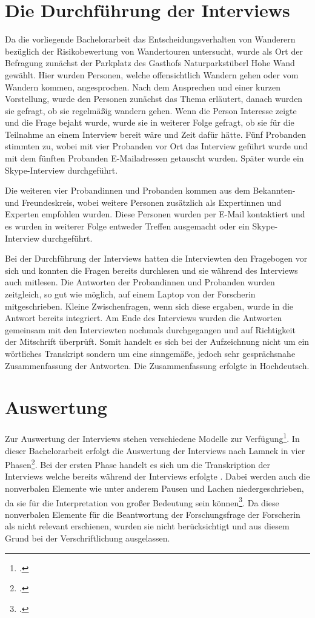 \section{Die Durchführung der Interviews}

Da die vorliegende Bachelorarbeit das Entscheidungsverhalten von Wanderern bezüglich der Risikobewertung von Wandertouren untersucht, wurde als Ort der Befragung zunächst der Parkplatz des Gasthofs Naturparkstüberl Hohe Wand gewählt. Hier wurden Personen, welche offensichtlich Wandern gehen oder vom Wandern kommen, angesprochen.
Nach dem Ansprechen und einer kurzen Vorstellung, wurde den Personen zunächst das Thema erläutert, danach wurden sie gefragt, ob sie regelmäßig wandern gehen. Wenn die Person Interesse zeigte und die Frage bejaht wurde, wurde sie in weiterer Folge gefragt, ob sie für die Teilnahme an einem Interview bereit wäre und Zeit dafür hätte. Fünf Probanden stimmten zu, wobei mit vier Probanden vor Ort das Interview geführt wurde und mit dem fünften Probanden  E-Mailadressen getauscht wurden. Später wurde ein Skype-Interview durchgeführt.

Die weiteren vier Probandinnen und Probanden kommen aus dem Bekannten- und Freundeskreis, wobei weitere Personen zusätzlich als Expertinnen und Experten empfohlen wurden. Diese Personen wurden per E-Mail kontaktiert und es wurden in weiterer Folge entweder Treffen ausgemacht oder ein Skype-Interview durchgeführt.

Bei der Durchführung der Interviews hatten die Interviewten den Fragebogen vor sich und konnten die Fragen bereits durchlesen und sie während des Interviews auch mitlesen. Die Antworten der Probandinnen und Probanden wurden zeitgleich, so gut wie möglich, auf einem Laptop von der Forscherin mitgeschrieben. Kleine Zwischenfragen, wenn sich diese ergaben, wurde in die Antwort bereits integriert. Am Ende des Interviews wurden die Antworten gemeinsam mit den Interviewten nochmals durchgegangen und auf Richtigkeit der Mitschrift überprüft.
Somit handelt es sich bei der Aufzeichnung nicht um ein wörtliches Transkript sondern um eine sinngemäße, jedoch sehr gesprächsnahe Zusammenfassung der Antworten. Die Zusammenfassung erfolgte in Hochdeutsch.

\section{Auswertung}

Zur Auswertung der Interviews stehen verschiedene Modelle zur Verfügung\footcite[S. 47]{mayer}. In dieser Bachelorarbeit erfolgt die Auswertung der Interviews nach Lamnek in vier Phasen\footcite[S. 367]{lamnek}. Bei der ersten Phase handelt es sich um die Transkription der Interviews welche bereits während der Interviews erfolgte . Dabei werden auch die nonverbalen Elemente wie unter anderem Pausen und Lachen niedergeschrieben, da sie für die Interpretation von großer Bedeutung sein können\footcite[S. 367]{lamnek}. Da diese nonverbalen Elemente für die Beantwortung der Forschungsfrage der Forscherin als nicht relevant erschienen, wurden sie nicht berücksichtigt und aus diesem Grund bei der Verschriftlichung ausgelassen.

